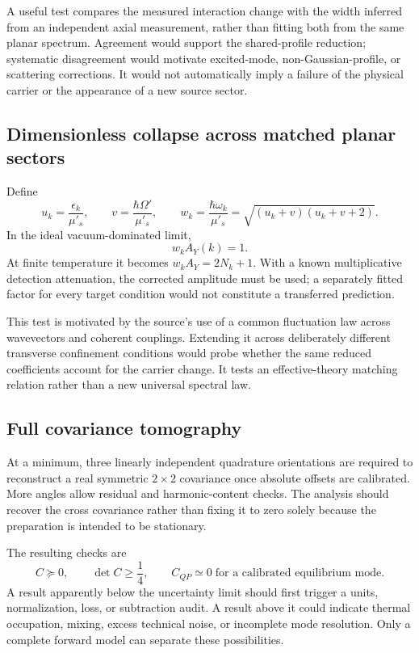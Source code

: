 \documentclass[11pt,a4paper]{article}
\theoremstyle{definition}
\theoremstyle{remark}
\newcommand{\musp}{\mu'_s}
\begin{document}
A useful test compares the measured interaction change with the width inferred from an independent axial measurement, rather than fitting both from the same planar spectrum. Agreement would support the shared-profile reduction; systematic disagreement would motivate excited-mode, non-Gaussian-profile, or scattering corrections. It would not automatically imply a failure of the physical carrier or the appearance of a new source sector.

\subsection{Dimensionless collapse across matched planar sectors}
Define
\begin{equation}
 u_k=\frac{\epsilon_k}{\musp},\qquad
 v=\frac{\hbar\Omega'}{\musp},\qquad
 w_k=\frac{\hbar\omega_k}{\musp}
     =\sqrt{(u_k+v)(u_k+v+2)}.
 \label{eq:dimensionless}
\end{equation}
In the ideal vacuum-dominated limit,
\begin{equation}
 w_k A_Y(k)=1.
 \label{eq:vacuum_collapse}
\end{equation}
At finite temperature it becomes $w_kA_Y=2N_k+1$. With a known multiplicative detection attenuation, the corrected amplitude must be used; a separately fitted factor for every target condition would not constitute a transferred prediction.

This test is motivated by the source's use of a common fluctuation law across wavevectors and coherent couplings. Extending it across deliberately different transverse confinement conditions would probe whether the same reduced coefficients account for the carrier change. It tests an effective-theory matching relation rather than a new universal spectral law.\cite{zhang2026}

\subsection{Full covariance tomography}
At a minimum, three linearly independent quadrature orientations are required to reconstruct a real symmetric $2\times2$ covariance once absolute offsets are calibrated. More angles allow residual and harmonic-content checks. The analysis should recover the cross covariance rather than fixing it to zero solely because the preparation is intended to be stationary.

The resulting checks are
\begin{equation}
 C\succeq0,\qquad \det C\geq\frac14,
 \qquad C_{QP}\simeq0\;\text{for a calibrated equilibrium mode}.
 \label{eq:tomography_checks}
\end{equation}
A result apparently below the uncertainty limit should first trigger a units, normalization, loss, or subtraction audit. A result above it could indicate thermal occupation, mixing, excess technical noise, or incomplete mode resolution. Only a complete forward model can separate these possibilities.\cite{weedbrook}
\end{document}
